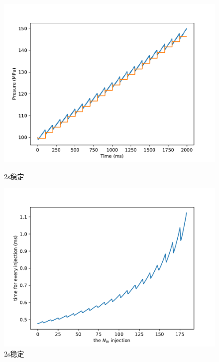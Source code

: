 \documentclass{cumcmthesis}
\begin{document}
\begin{figure}[htbp]
    \centering
    \begin{minipage}[t]{0.48\textwidth}
        \centering
        \includegraphics[scale=.45]{3000.pdf}
        \caption{2s稳定}
        \label{2000}
    \end{minipage}
    \begin{minipage}[t]{0.48\textwidth}
        \centering
        \includegraphics[scale=0.45]{3000t.pdf}
        \caption{2s稳定}
        \label{2000t}
    \end{minipage}
    \begin{minipage}[t]{0.48\textwidth}
        \centering

\end{minipage}
\end{figure}
\end{document}
